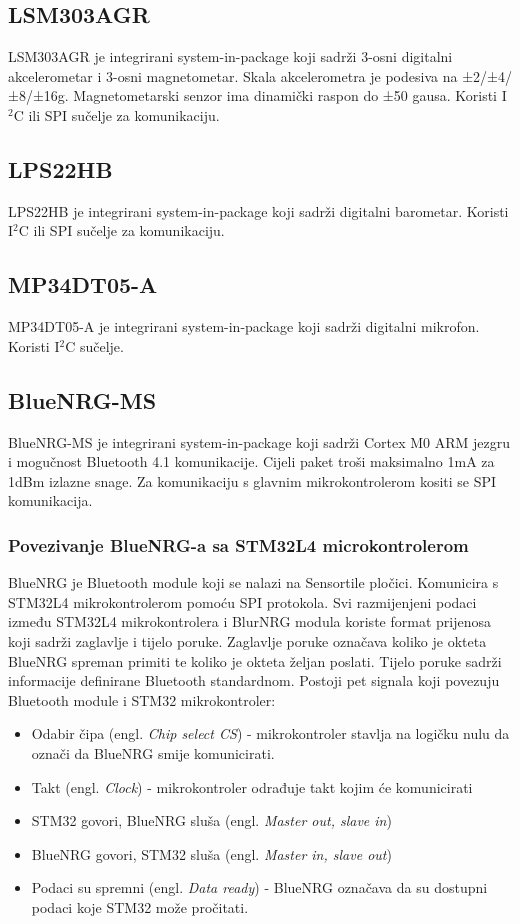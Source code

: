 \documentclass[times, utf8, diplomski]{diplomski}
\begin{document}
\subsection{LSM303AGR}
LSM303AGR je integrirani system-in-package koji sadrži 3-osni digitalni akcelerometar i 3-osni magnetometar. Skala akcelerometra je podesiva na
±2/±4/±8/±16g. Magnetometarski senzor ima dinamički raspon do ±50 gausa. Koristi I\(^2\)C ili SPI sučelje za komunikaciju.

\subsection{LPS22HB}
LPS22HB je integrirani system-in-package koji sadrži digitalni barometar. Koristi I\(^2\)C ili SPI sučelje za komunikaciju.

\subsection{MP34DT05-A}
MP34DT05-A je integrirani system-in-package koji sadrži digitalni mikrofon. Koristi I\(^2\)C sučelje.

\subsection{BlueNRG-MS}
BlueNRG-MS \cite{BlueNrgMs} je integrirani system-in-package koji sadrži Cortex M0 ARM jezgru i mogučnost Bluetooth 4.1 komunikacije.
Cijeli paket troši maksimalno 1mA za 1dBm izlazne snage. Za komunikaciju s glavnim mikrokontrolerom kositi se SPI komunikacija.

\subsubsection{Povezivanje BlueNRG-a sa STM32L4 microkontrolerom}
BlueNRG je Bluetooth module koji se nalazi na Sensortile pločici. Komunicira s STM32L4 mikrokontrolerom pomoću SPI protokola.
Svi razmijenjeni podaci između STM32L4 mikrokontrolera i BlurNRG modula koriste format prijenosa koji sadrži zaglavlje i tijelo poruke.
Zaglavlje poruke označava koliko je okteta BlueNRG spreman primiti te koliko je okteta željan poslati. Tijelo poruke sadrži informacije definirane Bluetooth standardnom.
Postoji pet signala koji povezuju Bluetooth module i STM32 mikrokontroler:

\begin{itemize}
  \item Odabir čipa (engl. \textit{Chip select CS}) - mikrokontroler stavlja na logičku nulu da označi da BlueNRG smije komunicirati.
  \item Takt (engl. \textit{Clock}) - mikrokontroler odrađuje takt kojim će komunicirati
  \item STM32 govori, BlueNRG sluša (engl. \textit{Master out, slave in})
  \item BlueNRG govori, STM32 sluša (engl. \textit{Master in, slave out})
  \item Podaci su spremni (engl. \textit{Data ready}) - BlueNRG označava da su dostupni podaci koje STM32 može pročitati.
\end{itemize}
\end{document}
